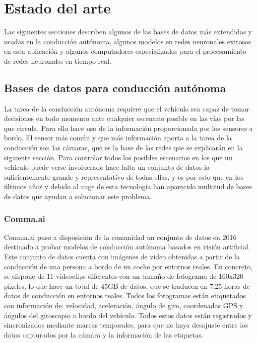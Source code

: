\chapter{Estado del arte}

Las siguientes secciones describen algunos de las bases de datos más extendidas y usadas en la conducción autónoma, algunos modelos en redes neuronales exitosos en esta aplicación y algunos computadores especializados para el procesamiento de redes neuronales en tiempo real.

\section{Bases de datos para conducción autónoma}
\label{sec:datasets}

La tarea de la conducción autónoma requiere que el vehículo sea capaz de tomar decisiones en todo momento ante cualquier escenario posible en las vías por las que circula. Para ello hace uso de la información proporcionada por los sensores a bordo. El sensor más común y que más información aporta a la tarea de la conducción son las cámaras, que es la base de las redes que se explicarán en la siguiente sección. Para controlar todos los posibles escenarios en los que un vehículo puede verse involucrado hace falta un conjunto de datos lo suficientemente grande y representativo de todas ellas, y es por esto que en los últimos años y debido al auge de esta tecnología han aparecido multitud de bases de datos que ayudan a solucionar este problema.
    
\subsection{Comma.ai}

Comma.ai puso a disposición de la comunidad un conjunto de datos en 2016 \cite{comma} destinado a probar modelos de conducción autónoma basados en visión artificial. Este conjunto de datos cuenta con imágenes de vídeo obtenidas a partir de la conducción de una persona a bordo de un coche por entornos reales. En concreto, se dispone de 11 videoclips diferentes con un tamaño de fotograma de 160x320 píxeles, lo que hace un total de 45GB de datos, que se traducen en 7.25 horas de datos de conducción en entornos reales. Todos los fotogramas están etiquetados con información de: velocidad, aceleración, ángulo de giro, coordenadas GPS y ángulos del giroscopio a bordo del vehículo. Todos estos datos están registrados y sincronizados mediante marcas temporales, para que no haya desajuste entre los datos capturados por la cámara y la información de las etiquetas.

